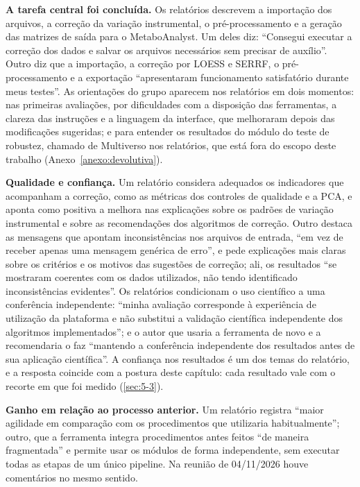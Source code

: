\textbf{A tarefa central foi concluída.} Os relatórios descrevem a importação dos arquivos, a correção da variação instrumental, o pré-processamento e a geração das matrizes de saída para o MetaboAnalyst. Um deles diz: ``Consegui executar a correção dos dados e salvar os arquivos necessários sem precisar de auxílio''. Outro diz que a importação, a correção por LOESS e SERRF, o pré-processamento e a exportação ``apresentaram funcionamento satisfatório durante meus testes''. As orientações do grupo aparecem nos relatórios em dois momentos: nas primeiras avaliações, por dificuldades com a disposição das ferramentas, a clareza das instruções e a linguagem da interface, que melhoraram depois das modificações sugeridas; e para entender os resultados do módulo do teste de robustez, chamado de Multiverso nos relatórios, que está fora do escopo deste trabalho (Anexo~\ref{anexo:devolutiva}).

\textbf{Qualidade e confiança.} Um relatório considera adequados os indicadores que acompanham a correção, como as métricas dos controles de qualidade e a PCA, e aponta como positiva a melhora nas explicações sobre os padrões de variação instrumental e sobre as recomendações dos algoritmos de correção. Outro destaca as mensagens que apontam inconsistências nos arquivos de entrada, ``em vez de receber apenas uma mensagem genérica de erro'', e pede explicações mais claras sobre os critérios e os motivos das sugestões de correção; ali, os resultados ``se mostraram coerentes com os dados utilizados, não tendo identificado inconsistências evidentes''. Os relatórios condicionam o uso científico a uma conferência independente: ``minha avaliação corresponde à experiência de utilização da plataforma e não substitui a validação científica independente dos algoritmos implementados''; e o autor que usaria a ferramenta de novo e a recomendaria o faz ``mantendo a conferência independente dos resultados antes de sua aplicação científica''. A confiança nos resultados é um dos temas do relatório, e a resposta coincide com a postura deste capítulo: cada resultado vale com o recorte em que foi medido (\ref{sec:5-3}).

\textbf{Ganho em relação ao processo anterior.} Um relatório registra ``maior agilidade em comparação com os procedimentos que utilizaria habitualmente''; outro, que a ferramenta integra procedimentos antes feitos ``de maneira fragmentada'' e permite usar os módulos de forma independente, sem executar todas as etapas de um único pipeline. Na reunião de 04/11/2026 houve comentários no mesmo sentido.

